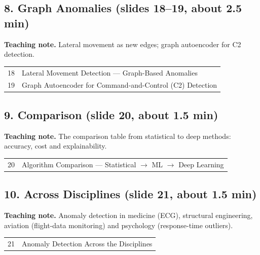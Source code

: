 \documentclass[11pt]{article}
\begin{document}
\subsection{8. Graph Anomalies \normalfont\small\color{GreyN}(slides 18--19, about 2.5 min)}

\textbf{Teaching note.} Lateral movement as new edges; graph autoencoder for C2 detection.

\begin{center}\small\renewcommand{\arraystretch}{1.1}\begin{tabularx}{\textwidth}{@{}r X@{}}18 & Lateral Movement Detection --- Graph-Based Anomalies\\
19 & Graph Autoencoder for Command-and-Control (C2) Detection\\\end{tabularx}\end{center}

\subsection{9. Comparison \normalfont\small\color{GreyN}(slide 20, about 1.5 min)}

\textbf{Teaching note.} The comparison table from statistical to deep methods: accuracy, cost and explainability.

\begin{center}\small\renewcommand{\arraystretch}{1.1}\begin{tabularx}{\textwidth}{@{}r X@{}}20 & Algorithm Comparison --- Statistical $\to$ ML $\to$ Deep Learning\\\end{tabularx}\end{center}

\subsection{10. Across Disciplines \normalfont\small\color{GreyN}(slide 21, about 1.5 min)}

\textbf{Teaching note.} Anomaly detection in medicine (ECG), structural engineering, aviation (flight-data monitoring) and psychology (response-time outliers).

\begin{center}\small\renewcommand{\arraystretch}{1.1}\begin{tabularx}{\textwidth}{@{}r X@{}}21 & Anomaly Detection Across the Disciplines\\\end{tabularx}\end{center}
\end{document}
